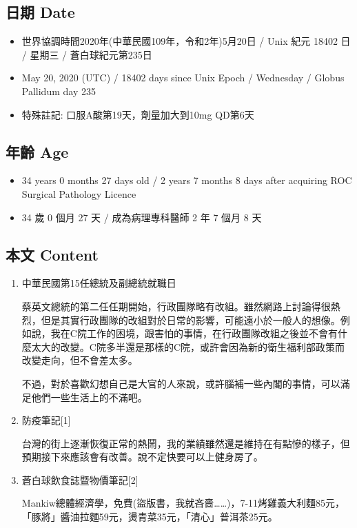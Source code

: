 \documentclass[a5paper, 12pt
]{book}
\providecommand{\tightlist}{%
  \setlength{\itemsep}{0pt}\setlength{\parskip}{0pt}}
\begin{document}
\hypertarget{ux65e5ux671f-date-80}{%
\subsection{日期 Date}\label{ux65e5ux671f-date-80}}

\begin{itemize}
\tightlist
\item
  世界協調時間2020年(中華民國109年，令和2年)5月20日 / Unix 紀元 18402 日
  / 星期三 / 蒼白球紀元第235日
\item
  May 20, 2020 (UTC) / 18402 days since Unix Epoch / Wednesday / Globus
  Pallidum day 235
\item
  特殊註記: 口服A酸第19天，劑量加大到10mg QD第6天
\end{itemize}

\hypertarget{ux5e74ux9f61-age-80}{%
\subsection{年齡 Age}\label{ux5e74ux9f61-age-80}}

\begin{itemize}
\tightlist
\item
  34 years 0 months 27 days old / 2 years 7 months 8 days after
  acquiring ROC Surgical Pathology Licence
\item
  34 歲 0 個月 27 天 / 成為病理專科醫師 2 年 7 個月 8 天
\end{itemize}

\hypertarget{ux672cux6587-content-80}{%
\subsection{本文 Content}\label{ux672cux6587-content-80}}

\begin{enumerate}
\def\labelenumi{\arabic{enumi}.}
\item
  中華民國第15任總統及副總統就職日

  蔡英文總統的第二任任期開始，行政團隊略有改組。雖然網路上討論得很熱烈，但是其實行政團隊的改組對於日常的影響，可能遠小於一般人的想像。例如說，我在C院工作的困境，跟害怕的事情，在行政團隊改組之後並不會有什麼太大的改變。C院多半還是那樣的C院，或許會因為新的衛生福利部政策而改變走向，但不會差太多。

  不過，對於喜歡幻想自己是大官的人來說，或許腦補一些內閣的事情，可以滿足他們一些生活上的不滿吧。
\item
  防疫筆記{[}1{]}

  台灣的街上逐漸恢復正常的熱鬧，我的業績雖然還是維持在有點慘的樣子，但預期接下來應該會有改善。說不定快要可以上健身房了。
\item
  蒼白球飲食誌暨物價筆記{[}2{]}

  Mankiw總體經濟學，免費(盜版書，我就吝嗇\ldots\ldots)，7-11烤雞義大利麵85元，「豚將」醬油拉麵59元，燙青菜35元，「清心」普洱茶25元。
\end{enumerate}
\end{document}
